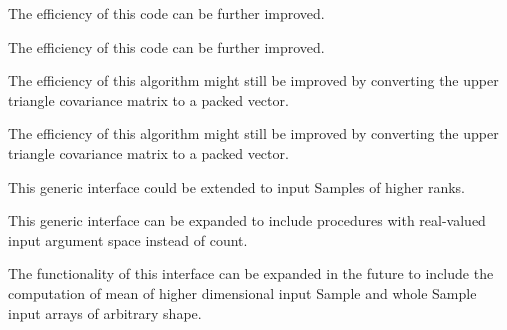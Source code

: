 \begin{DoxyRefList}
\item[Subprogram \mbox{\hyperlink{namespaceSample__mod_af9dafbc79f11fc37f384877e49f3bf27}{Sample\+\_\+mod\+::get\+Cho\+Low\+Cov\+Upp}} (nd, np, Mean, Sample, Cho\+Low\+Cov\+Upp, Cho\+Dia)]\label{todo__todo000064}%
%
 The efficiency of this code can be further improved. 
\item[Subprogram \mbox{\hyperlink{namespaceSample__mod_a1e5daab49859d9c21c4ec3c916ec963d}{Sample\+\_\+mod\+::get\+Cho\+Low\+Cov\+Upp\+High\+Dim}} (nd, np, Mean, Sample, Cho\+Low\+Cov\+Upp, Cho\+Dia)]\label{todo__todo000065}%
%
 The efficiency of this code can be further improved. 
\item[Subprogram \mbox{\hyperlink{namespaceSample__mod_ab6c8a951bf35c59402a30d6d17a6d193}{Sample\+\_\+mod\+::merge\+Mean\+Cov\+Upp}} (nd, npA, MeanA, Cov\+UppA, npB, MeanB, Cov\+UppB, Mean\+AB, Cov\+Upp\+AB)]\label{todo__todo000066}%
%
 The efficiency of this algorithm might still be improved by converting the upper triangle covariance matrix to a packed vector. 
\item[Subprogram \mbox{\hyperlink{namespaceSample__mod_a81524ddc27a48db65744d80cfad9b348}{Sample\+\_\+mod\+::merge\+Mean\+Cov\+Upp\+Dense}} (nd, npA, MeanA, Cov\+UppA, npB, MeanB, Cov\+UppB)]\label{todo__todo000067}%
%
 The efficiency of this algorithm might still be improved by converting the upper triangle covariance matrix to a packed vector. 
\item[Type \mbox{\hyperlink{interfaceSampleECDF__mod_1_1getECDF}{Sample\+ECDF\+\_\+mod\+::get\+ECDF}} ]\label{todo__todo000068}%
%
 This generic interface could be extended to input {\ttfamily Sample}s of higher ranks. 
\item[Type \mbox{\hyperlink{interfaceSampleFlat__mod_1_1genFlat}{Sample\+Flat\+\_\+mod\+::gen\+Flat}} ]\label{todo__todo000069}%
%
 This generic interface can be expanded to include procedures with real-\/valued input argument {\ttfamily space} instead of {\ttfamily count}. 
\item[Type \mbox{\hyperlink{interfaceSampleMean__mod_1_1genMean}{Sample\+Mean\+\_\+mod\+::gen\+Mean}} ]\label{todo__todo000070}%
%
 The functionality of this interface can be expanded in the future to include the computation of mean of higher dimensional input {\ttfamily Sample} and whole {\ttfamily Sample} input arrays of arbitrary shape. 
\item[Type \mbox{\hyperlink{interfaceSampleShift__mod_1_1genShifted}{Sample\+Shift\+\_\+mod\+::gen\+Shifted}} ]\label{todo__todo000071}%

\end{DoxyRefList}

